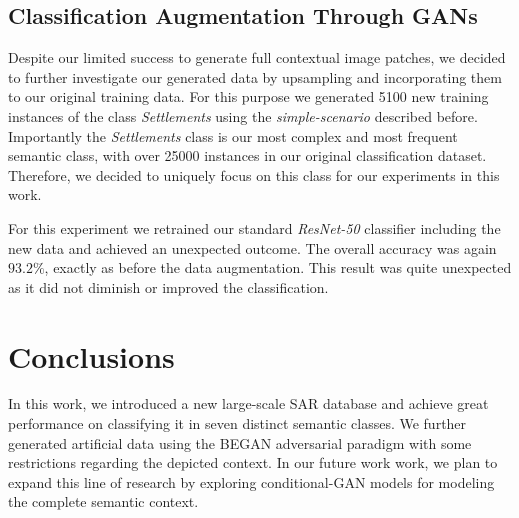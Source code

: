 \documentclass{article}
\begin{document}
\subsection{Classification Augmentation Through GANs}

Despite our limited success to generate full contextual image patches, we decided to further investigate our generated data
by upsampling and incorporating them to our original training data. For this purpose we generated 5100 new training
instances of the class \textit{Settlements} using the \emph{simple-scenario} described before. 
%
Importantly the \textit{Settlements} class is our most complex and most frequent semantic class, with over 25000 instances
in our original classification dataset. Therefore, we decided to uniquely focus on this class for our experiments in this work.

\bigskip

\noindent
For this experiment we retrained our standard \emph{ResNet-50} classifier 
including the new data and achieved an unexpected outcome. 
%
The overall accuracy was again $93.2\%$, exactly as before the data augmentation. 
This result was quite unexpected as it did not diminish
or improved the classification. 

\section{Conclusions}

In this work, we introduced a new large-scale SAR database and achieve
great performance on classifying it in seven distinct semantic classes.
We further generated artificial data using the BEGAN adversarial 
paradigm with some restrictions regarding the depicted context.
%
In our future work work, we plan to expand this line of research
by exploring conditional-GAN models for modeling the complete 
semantic context.
\end{document}
